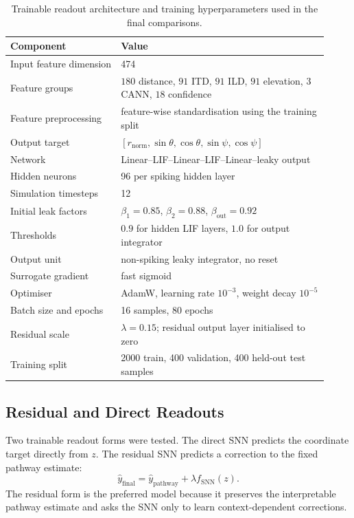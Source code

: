 \begin{table}[h]
\centering
\caption{Trainable readout architecture and training hyperparameters used in the final comparisons.}
\label{tab:trainable_snn_architecture}
\begin{tabular}{p{0.32\linewidth}p{0.60\linewidth}}
\toprule
Component & Value \\
\midrule
Input feature dimension & 474 \\
Feature groups & $180$ distance, $91$ ITD, $91$ ILD, $91$ elevation, $3$ CANN, $18$ confidence \\
Feature preprocessing & feature-wise standardisation using the training split \\
Output target & $[r_{\mathrm{norm}}, \sin\theta, \cos\theta, \sin\psi, \cos\psi]$ \\
Network & Linear--LIF--Linear--LIF--Linear--leaky output \\
Hidden neurons & 96 per spiking hidden layer \\
Simulation timesteps & 12 \\
Initial leak factors & $\beta_1=0.85$, $\beta_2=0.88$, $\beta_{\mathrm{out}}=0.92$ \\
Thresholds & $0.9$ for hidden LIF layers, $1.0$ for output integrator \\
Output unit & non-spiking leaky integrator, no reset \\
Surrogate gradient & fast sigmoid \\
Optimiser & AdamW, learning rate $10^{-3}$, weight decay $10^{-5}$ \\
Batch size and epochs & 16 samples, 80 epochs \\
Residual scale & $\lambda=0.15$; residual output layer initialised to zero \\
Training split & 2000 train, 400 validation, 400 held-out test samples \\
\bottomrule
\end{tabular}
\end{table}

\subsection{Residual and Direct Readouts}

Two trainable readout forms were tested. The direct SNN predicts the coordinate target directly from $z$. The residual SNN predicts a correction to the fixed pathway estimate:
\begin{equation}
    \hat{y}_{\mathrm{final}}
    =
    \hat{y}_{\mathrm{pathway}}
    +
    \lambda f_{\mathrm{SNN}}(z).
\end{equation}
The residual form is the preferred model because it preserves the interpretable pathway estimate and asks the SNN only to learn context-dependent corrections.

